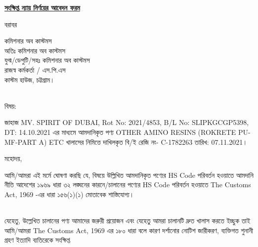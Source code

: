 \documentclass[12pt]{article}
\newcommand{\beno}{C-1782263}
\newcommand{\bedt}{07.11.2021}
\newcommand{\blno}{SLIPKGCGP5398}
\newcommand{\bldt}{14.10.2021}
\newcommand{\good}{OTHER AMINO RESINS (ROKRETE PU-MF-PART A) ETC}
\newcommand{\vessel}{MV. SPIRIT OF DUBAI}
\newcommand{\menifest}{2021/4853}
\begin{document}
\begin{center}
\underline{\textbf{সংক্ষিপ্ত ন্যায় নির্ণয়ের আবেদন ফরম}}
\end{center}
\noindent
বরাবর
\\
\begin{minipage}[t]{0.08\linewidth}
\hspace{0em}
\end{minipage}
\begin{minipage}[t]{0.92\linewidth}
কমিশনার অব কাস্টমস
\\
অতিঃ কমিশনার অব কাস্টমস
\\
যুগ্ম/ডেপুটি/সহঃ কমিশনার অব কাস্টমস
\\
রাজস্ব কর্মকর্তা / এস.পি.এস
\\
কাস্টম হাউজ,
চট্টগ্রাম।
\\
\\
\end{minipage}
\begin{minipage}[t]{0.08\linewidth}
বিষয়:
\end{minipage}
\begin{minipage}[t]{0.92\linewidth}
জাহাজ {\vessel}, Rot No: {\menifest}, B/L No: {\blno}, DT: {\bldt}
এর মাধ্যমে আমদানিকৃত পণ্য {\good} খালাসের নিমিত্তে
দাখিলকৃত বি/ই রেজি নং- {\beno} তারিখ: {\bedt}।
\\
\end{minipage}
\begin{minipage}[t]{0.08\linewidth}
মহোদয়,
\end{minipage}
\begin{minipage}[t]{0.92\linewidth}
\hspace{1em}
\end{minipage}
\begin{minipage}[t]{0.08\linewidth}
\hspace{1em}
\end{minipage}
আমি/আমরা এই মর্মে ঘোষণা
করছি যে, বিষয়ে উল্লিখিত আমদানিকৃত পণ্যের HS Code
পরিবর্তন হওয়াতে আমদানি নীতি আদেশের ১৯৬৯ ধারা
৩২ লঙ্ঘনের কারনে/চালানের পণ্যের HS Code
পরিবর্তন হওয়াতে
The Customs Act, 1969
-এর ধারা
১৫৬(১)(১) মোতাবেক শাস্তিযোগ্য।
\\
\\
\begin{minipage}[t]{0.08\linewidth}
\hspace{1em}
\end{minipage}
যেহেতু, উল্লেখিত চালানের পণ্য আমাদের জরুরী প্রয়োজন
এবং যেহেতু আমরা চালানটি দ্রুত খালাস করতে ইচ্ছুক
তাই আমি/আমরা
The Customs Act, 1969
এর ১৮০ ধারা বলে কারণ দর্শানোর নোটিশ
জারীকরণ, ব্যক্তিগত শুনানী গ্রহণ ইত্যাদি ব্যতিরেকে সংক্ষিপ্ত
\end{document}

